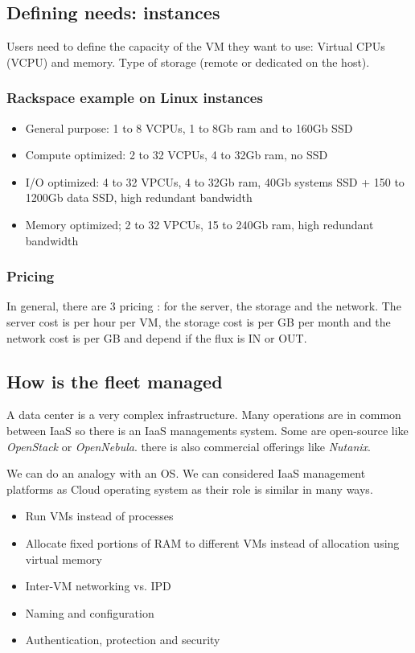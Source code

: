 \subsection{Defining needs: instances}

Users need to define the capacity of the VM they want to use: Virtual CPUs (VCPU) and memory. Type of storage (remote or dedicated on the host).

\subsubsection{Rackspace example on Linux instances}

\begin{itemize}
    \item General purpose: 1 to 8 VCPUs, 1 to 8Gb ram and to 160Gb SSD
    \item Compute optimized: 2 to 32 VCPUs, 4 to 32Gb ram, no SSD
    \item I/O optimized: 4 to 32 VPCUs, 4 to 32Gb ram, 40Gb systems SSD + 150 to 1200Gb data SSD, high redundant bandwidth
    \item Memory optimized; 2 to 32 VPCUs, 15 to 240Gb ram, high redundant bandwidth
\end{itemize}

\subsubsection{Pricing}

In general, there are 3 pricing : for the server, the storage and the network. The server cost is per hour per VM, the storage cost is per GB per month and the network cost is per GB and depend if the flux is IN or OUT.

\subsection{How is the fleet managed}

A data center is a very complex infrastructure. Many operations are in common between IaaS so there is an IaaS managements system. Some are open-source like \textit{OpenStack} or \textit{OpenNebula}. there is also commercial offerings like \textit{Nutanix}.

We can do an analogy with an OS. We can considered IaaS management platforms as Cloud operating system as their role is similar in many ways.
\begin{itemize}
    \item Run VMs instead of processes
    \item Allocate fixed portions of RAM to different VMs instead of allocation using virtual memory
    \item Inter-VM networking vs. IPD
    \item Naming and configuration
    \item Authentication, protection and security
\end{itemize}

